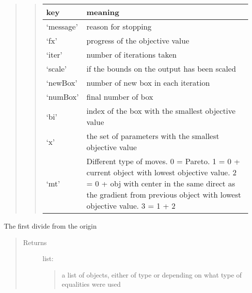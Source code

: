 \documentclass[letterpaper,10pt,english]{sphinxmanual}
\begin{document}
\begin{fulllineitems}
\begin{fulllineitems}
\begin{quote}
\begin{description}
\begin{quote}
\begin{tabulary}{\linewidth}{|L|L|}
\hline
\textsf{\relax 
key
} & \textsf{\relax 
meaning
}\\
\hline
`message'
 & 
reason for stopping
\\
\hline
`fx'
 & 
progress of the objective value
\\
\hline
`iter'
 & 
number of iterations taken
\\
\hline
`scale'
 & 
if the bounds on the output has been scaled
\\
\hline
`newBox'
 & 
number of new box in each iteration
\\
\hline
`numBox'
 & 
final number of box
\\
\hline
`bi'
 & 
index of the box with the smallest objective value
\\
\hline
`x'
 & 
the set of parameters with the smallest objective value
\\
\hline
`mt'
 & 
Different type of moves.
0 = Pareto.
1 = 0 + current object with lowest objective value.
2 = 0 + obj with center in the same direct as the gradient
from previous object with lowest objective value.
3 = 1 + 2
\\
\hline\end{tabulary}

\end{quote}

\end{description}\end{quote}

\end{fulllineitems}



\begin{fulllineitems}
The first divide from the origin
\begin{quote}\begin{description}
\item[{Returns}] \leavevmode
list:
\begin{quote}

a list of objects, either of type  or 
 depending on what type of equalities
were used
\end{quote}

\end{description}\end{quote}

\end{fulllineitems}




\end{fulllineitems}
\end{document}
